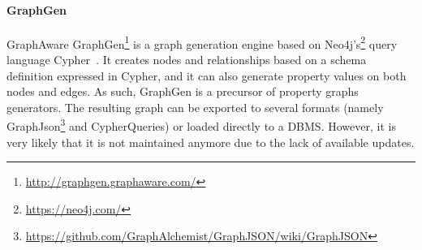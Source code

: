 
\paragraph{GraphGen}  GraphAware GraphGen\footnote{\url{http://graphgen.graphaware.com/}} is a graph generation engine based on Neo4j's\footnote{\url{https://neo4j.com/}} query language Cypher~\cite{GraphGen}.  It creates nodes and relationships based on a schema definition expressed in Cypher, and it can also generate property values on both
nodes and edges. As such, GraphGen is a precursor of property graphs generators. The resulting graph can be exported to several formats (namely GraphJson\footnote{\url{https://github.com/GraphAlchemist/GraphJSON/wiki/GraphJSON}} and CypherQueries) or loaded directly to a DBMS. However, it is very likely that it is not maintained anymore due to the lack of available updates.
